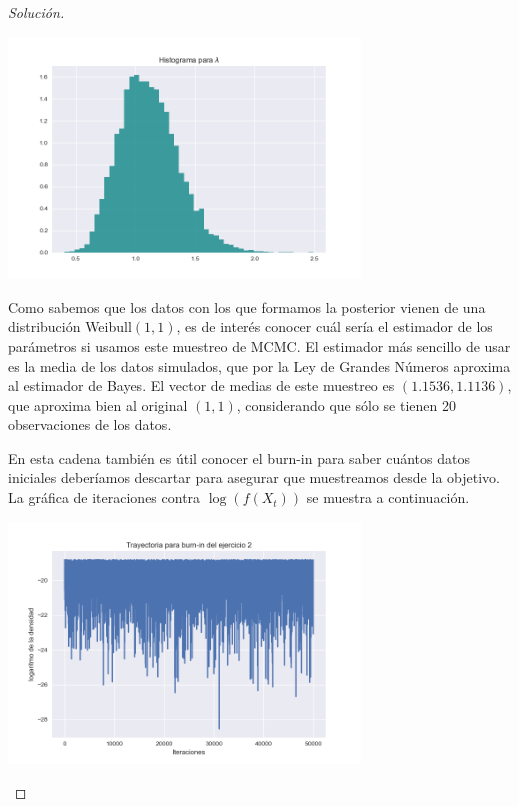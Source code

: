 \documentclass{article}
\begin{document}
\begin{enumerate}
\begin{proof}[Solución]
        \begin{center}
            \includegraphics[width=0.7\textwidth]{Tarea8/hist22.png}
        \end{center}

        Como sabemos que los datos con los que formamos la posterior vienen de una 
        distribución Weibull$(1,1)$, es de interés conocer cuál sería el estimador
        de los parámetros si usamos este muestreo de MCMC. El estimador más sencillo
        de usar es la media de los datos simulados, que por la Ley de Grandes Números
        aproxima al estimador de Bayes. El vector de medias de este muestreo es 
        $(1.1536,1.1136)$, que aproxima bien al original $(1,1)$, considerando que 
        sólo se tienen 20 observaciones de los datos.


        En esta cadena también es útil conocer el burn-in para saber cuántos datos 
        iniciales deberíamos descartar para asegurar que muestreamos desde la objetivo.
        La gráfica de iteraciones contra $\log(f(X_t))$  se muestra a 
        continuación.

        \begin{center}
            \includegraphics[width=0.7\textwidth]{Tarea8/burnin3.png}
        \end{center}


\end{proof}
\end{enumerate}
\end{document}
